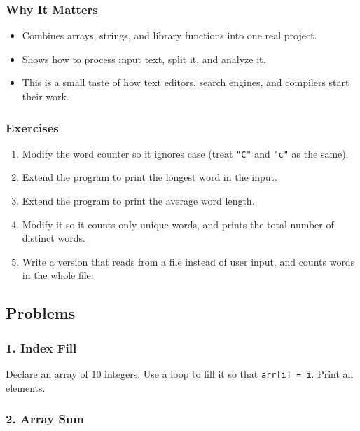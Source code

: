 \documentclass[
  letterpaper,
  DIV=11,
  numbers=noendperiod]{scrreprt}
\providecommand{\tightlist}{%
  \setlength{\itemsep}{0pt}\setlength{\parskip}{0pt}}
\begin{document}
\subsubsection{Why It Matters}\label{why-it-matters-28}

\begin{itemize}
\tightlist
\item
  Combines arrays, strings, and library functions into one real project.
\item
  Shows how to process input text, split it, and analyze it.
\item
  This is a small taste of how text editors, search engines, and
  compilers start their work.
\end{itemize}

\subsubsection{Exercises}\label{exercises-29}

\begin{enumerate}
\def\labelenumi{\arabic{enumi}.}
\tightlist
\item
  Modify the word counter so it ignores case (treat \texttt{"C"} and
  \texttt{"c"} as the same).
\item
  Extend the program to print the longest word in the input.
\item
  Extend the program to print the average word length.
\item
  Modify it so it counts only unique words, and prints the total number
  of distinct words.
\item
  Write a version that reads from a file instead of user input, and
  counts words in the whole file.
\end{enumerate}

\subsection{Problems}\label{problems-4}

\subsubsection{1. Index Fill}\label{index-fill}

Declare an array of 10 integers. Use a loop to fill it so that
\texttt{arr{[}i{]}\ =\ i}. Print all elements.

\subsubsection{2. Array Sum}\label{array-sum}
\end{document}
